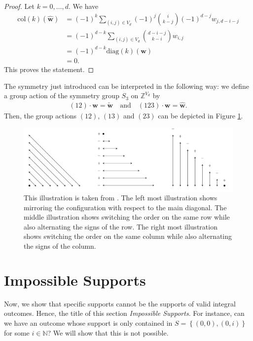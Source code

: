 \begin{proof}
    Let \( k = 0, \dots, d \). We have 
    \begin{align*}
        \mathrm{col}(k)(\hat{\mathbf w}) &= (-1)^k \sum_{(i,j) \in V_d}(-1)^j \binom{i}{k-j}(-1)^{d-j}w_{j, d-i-j} \\
        &= (-1)^{d-k} \sum_{(i,j) \in V_d}\binom{d-i-j}{k-i}w_{i, j} \\
        &= (-1)^{d-k} \mathrm{diag}(k)(\mathbf w)\\
        &= 0.
    \end{align*}
    This proves the statement.
\end{proof}

The symmetry just introduced can be interpreted in the following way: we define a group action of the symmetry group \( S_3 \) on \( \mathbb{Z}^{V_d} \) by 
\begin{align*}
    (12) \cdot \mathbf w = \tilde{\mathbf w} \quad \text{and} \quad (123) \cdot \mathbf w = \hat{\mathbf w}.
\end{align*}
Then, the group actions \( (12) \), \( (13) \) and \( (23) \) can be depicted in Figure \ref{fig:group-action-s3}.

\begin{figure}[H]
    \centering
    \includegraphics[width=\textwidth]{assets/group-action-s3.png}
    \caption{This illustration is taken from \cite{bik2022classifying}. The left most illustration shows mirroring the configuration with respect to the main diagonal. The middle illustration shows switching the order on the same row while also alternating the signs of the row. The right most illustration shows switching the order on the same column while also alternating the signs of the column.}
    \label{fig:group-action-s3}
\end{figure}

\section{Impossible Supports}\label{sec:impossible-supports}

Now, we show that specific supports cannot be the supports of valid integral outcomes. Hence, the title of this section \emph{Impossible Supports}. For instance, can we have an outcome whose support is only contained in \( S = \left\{ (0,0), (0,i) \right\} \) for some \( i \in \mathbb{N} \)? We will show that this is not possible.



